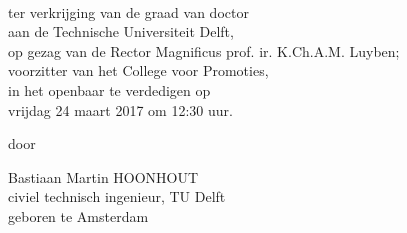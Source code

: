\begin{titlepage}
  \begin{center}
    \hfill
    
    \vspace{2cm}
    
    \begingroup
    \color{Maroon} \\ \bigskip
    \endgroup
    
    \vfill
    
    
    \vfill
    
    ter verkrijging van de graad van doctor \\
    aan de Technische Universiteit Delft, \\
    op gezag van de Rector Magnificus prof. ir. K.Ch.A.M. Luyben; \\
    voorzitter van het College voor Promoties, \\
    in het openbaar te verdedigen op \\
    vrijdag 24 maart 2017 om 12:30 uur.
    
    \vfill
    
    door
    
    \vfill
    
    Bastiaan Martin HOONHOUT \\
    civiel technisch ingenieur, TU Delft \\
    geboren te Amsterdam
    
    \vfill                      
    
  \end{center}  
\end{titlepage}

